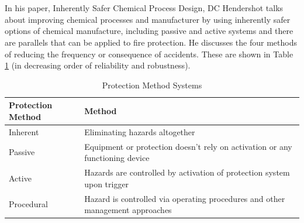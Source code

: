 \documentclass[table,a4paper,oneside]{book}
\begin{document}
\\
\\
In his paper, Inherently Safer Chemical Process Design, DC Hendershot \citep{Hendershot1997151} talks about improving chemical processes and manufacturer by using inherently safer options of chemical manufacture, including passive and active systems and there are parallels that can be applied to fire protection. He discusses the four methods of reducing the frequency or consequence of accidents. These are shown in Table \ref{tab:Protection Method Systems} (in decreasing order of reliability and robustness).

\begin{table}[htbp]
	\begin{center}
	\begin{tabular}{|l|l|}
 \hline
 \textbf{Protection Method} & \textbf{Method} \\
 \hline
 Inherent   & Eliminating hazards altogether \\
 Passive    & Equipment or protection  doesn't rely on activation or any functioning device \\
 Active     & Hazards are controlled by activation of protection system upon trigger \\
 Procedural & Hazard is controlled via operating procedures and other management approaches \\
 \hline
\end{tabular}
	\end{center}
\caption{Protection Method Systems}
\label{tab:Protection Method Systems}
\end{table}
\end{document}
